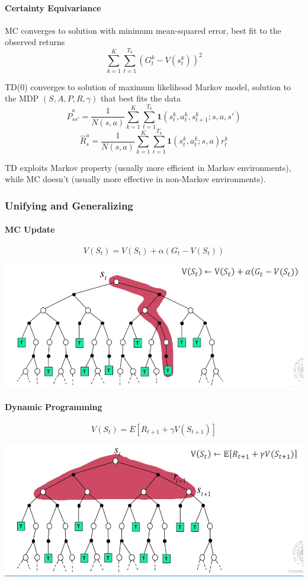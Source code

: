 \documentclass[10pt]{report}
\begin{document}
\paragraph{Certainty Equivariance}
\begin{list}{}{}
	\item MC converges to solution with minimum mean-squared error, best fit to the observed returns
	$$\sum_{k=1}^K\sum_{t=1}^{T_k}\left(G_t^k-V(s_t^k)\right)^2$$
	\item TD(0) converges to solution of maximum likelihood Markov model, solution to the MDP $(S, A, P, R, \gamma)$ that best fits the data
	$$\hat{P}_{ss'}^a = \frac{1}{N(s,a)}\sum_{k=1}^K\sum_{t=1}^{T_k} \mathbf{1}(s_t^k,a_t^k,s_{t+1}^k; s, a, s')$$
	$$\hat{R}_s^a = \frac{1}{N(s,a)}\sum_{k=1}^K\sum_{t=1}^{T_k} \mathbf{1}(s_t^k,a_t^k;s,a)r_t^k$$
\end{list}
TD exploits Markov property (usually more efficient in Markov environments), while MC doesn't (usually more effective in non-Markov environments).
\subsubsection{Unifying and Generalizing}
\paragraph{MC Update}
$$V(S_t)=V(S_t)+\alpha(G_t-V(S_t))$$
\begin{center}
	\includegraphics[scale=0.5]{166.png}
\end{center}
\pagebreak
\paragraph{Dynamic Programming}
$$V(S_t) = E[R_{t+1}+\gamma V(S_{t+1})]$$
\begin{center}
	\includegraphics[scale=0.5]{167.png}
\end{center}
\end{document}
